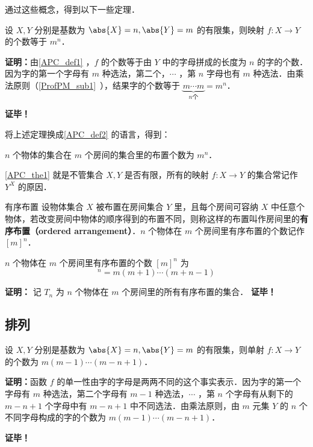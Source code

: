 通过这些概念，得到以下一些定理．

\begin{theorem}{}\label{APC_the1}
设 $X,Y$ 分别是基数为 $\abs{X}=n,\abs{Y}=m$ 的有限集，则映射 $f:X\rightarrow Y$ 的个数等于 $m^n$．
\end{theorem}
\textbf{证明：}由\autoref{APC_def1} ，$f$ 的个数等于由 $Y$ 中的字母拼成的长度为 $n$ 的字的个数．因为字的第一个字母有 $m$ 种选法，第二个，$\cdots$ ，第 $n$ 字母也有 $m$ 种选法．由乘法原则（\autoref{ProfPM_sub1}~），结果字的个数等于 $\underbrace{m\cdots m}_{n\text{个}}=m^n$．

\textbf{证毕！}

将上述定理换成\autoref{APC_def2} 的语言，得到：
\begin{theorem}{}
$n$ 个物体的集合在 $m$ 个房间的集合里的布置个数为 $m^n$．
\end{theorem}

\autoref{APC_the1} 就是不管集合 $X,Y$ 是否有限，所有的映射 $f:X\rightarrow Y$ 的集合常记作 $Y^X$ 的原因．

\begin{definition}{有序布置}
设物体集合 $X$ 被布置在房间集合 $Y$ 里，且每个房间可容纳 $X$ 中任意个物体，若改变房间中物体的顺序得到的布置不同，则称这样的布置叫作房间里的\textbf{有序布置（ordered arrangement）}．$n$ 个物体在 $m$ 个房间里有序布置的个数记作 $[m]^n$．
\end{definition}
\begin{theorem}{}
$n$ 个物体在 $m$ 个房间里有序布置的个数 $[m]^n$ 为
\begin{equation}
[m]^n=m(m+1)\cdots(m+n-1)
\end{equation}
\end{theorem}
\textbf{证明：}
记 $T_n$ 为 $n$ 个物体在 $m$ 个房间里的所有有序布置的集合． 
\textbf{证毕！}
\subsection{排列}
\begin{theorem}{}
设 $X,Y$ 分别是基数为 $\abs{X}=n,\abs{Y}=m$ 的有限集，则单射 $f:X\rightarrow Y$ 的个数为 $m(m-1)\cdots(m-n+1)$．
\end{theorem}
\textbf{证明：}函数 $f$ 的单一性由字的字母是两两不同的这个事实表示．因为字的第一个字母有 $m$ 种选法，第二个字母有 $m-1$ 种选法，$\cdots$ ，第 $n$ 个字母有从剩下的 $m-n+1$ 个字母中有 $m-n+1$ 中不同选法．由乘法原则，由 $m$ 元集 $Y$ 的 $n$ 个不同字母构成的字的个数为 $m(m-1)\cdots(m-n+1)$．

\textbf{证毕！}

